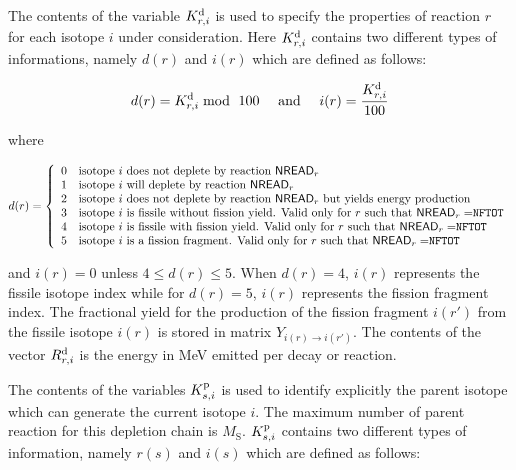\vskip 0.2cm

The contents of the variable $K_{r,i}^{\rm d}$ is used to specify the
properties of reaction $r$ for each isotope $i$ under consideration.
Here $K_{r,i}^{\rm d}$ contains two different types of informations, namely
$d(r)$ and $i(r)$ which are defined as follows:

\begin{equation}
  d(r)=K_{r,i}^{\rm d} \bmod \ 100 \ \ \ \ {\rm and} \ \ \ \ i(r)={K_{r,i}^{\rm d}  \over 100}
\end{equation}

\noindent where

\begin{displaymath}
d(r) = \left\{
\begin{array}{ll}
0 & \textrm{isotope $i$ does not deplete by reaction $\mathsf{NREAD}_{r}$} \\
1 & \textrm{isotope $i$ will deplete by reaction $\mathsf{NREAD}_{r}$} \\
2 & \textrm{isotope $i$ does not deplete by reaction $\mathsf{NREAD}_{r}$ but yields energy production} \\
3 & \textrm{isotope $i$ is fissile without fission yield. Valid only for $r$ such
that $\mathsf{NREAD}_{r}=${\tt NFTOT}} \\
4 & \textrm{isotope $i$ is fissile with fission yield. Valid only for $r$ such
that $\mathsf{NREAD}_{r}=${\tt NFTOT}} \\
5 & \textrm{isotope $i$ is a fission fragment. Valid only for $r$ such
that $\mathsf{NREAD}_{r}=${\tt NFTOT}}
\end{array} \right.
\end{displaymath}

\noindent and $i(r)=0$ unless $4\le d(r)\le 5$. When $d(r)=4$, $i(r)$ represents the fissile
isotope index while for $d(r)=5$, $i(r)$ represents the fission fragment index.
The fractional yield for the production of the fission fragment $i(r')$ from the
fissile isotope $i(r)$ is stored in matrix $Y_{i(r)\to i(r')}$.
The contents of the vector $R_{r,i}^{\rm d}$ is the energy in MeV emitted per
decay or reaction.

\vskip 0.2cm

The contents of the variables $K_{s,i}^{\rm p}$ is used to identify explicitly the parent isotope
which can generate the current isotope $i$. The maximum number of parent reaction for this
depletion chain is $M_{\mathrm{S}}$. $K_{s,i}^{\rm p}$ contains two different types of information,
namely $r(s)$ and $i(s)$ which are defined as follows:

